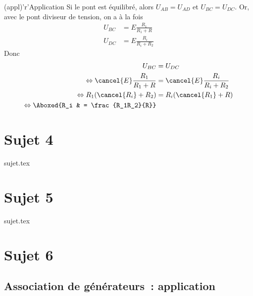 \documentclass[a4paper, 11pt]{book}
\begin{document}
{\begin{tcbraster}[raster columns=6, raster equal height=rows]
\begin{tcolorbox}[blankest, raster multicolumn=1, space to=\myspace]
\begin{tcbraster}[raster columns=1]
\begin{tcb}
				\end{tcb}
			\end{tcbraster}
		\end{tcolorbox}
		\begin{tcb}[raster multicolumn=3](appl)'r'{Application} Si le pont est
			équilibré, alors $U_{AB} = U_{AD}$ et $U_{BC} = U_{DC}$. Or, avec le
			pont diviseur de tension, on a à la fois
			\begin{align*}
				U_{BC} & = E \frac{R_1}{R_1+R}   \\
				U_{DC} & = E \frac{R_i}{R_i+R_2}
			\end{align*}
			Donc
			\begin{align*}
				U_{BC}                                & = U_{DC}                         \\
				\Leftrightarrow \cancel{E} \frac{R_1}{R_1+R}
				                                      & = \cancel{E} \frac{R_i}{R_i+R_2} \\
				\Leftrightarrow R_1(\cancel{R_i}+R_2) & = R_i(\cancel{R_1}+R)            \\
				\Leftrightarrow \Aboxed{R_i           & = \frac{R_1R_2}{R}}
			\end{align*}
		\end{tcb}
	\end{tcbraster}
}

\resetQ
\newpage

\chapter{Sujet 4}
{sujet.tex}

\resetQ
\newpage

\chapter{Sujet 5}
{sujet.tex}

\resetQ
\newpage

\chapter{Sujet 6}

\section{Association de générateurs~: application}
\end{document}
